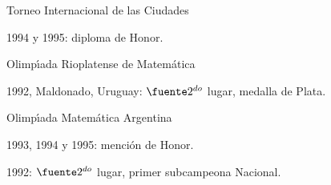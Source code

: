 \item { Torneo Internacional de las Ciudades}
\begin{compactitem}
\item 1994 y 1995: diploma de Honor.
\end{compactitem}

\item { Olimp\'{\i}ada Rioplatense de Matem\'atica}
\begin{compactitem}
\item 1992, Maldonado, Uruguay: $\fuente 2^{do}$ lugar, medalla de
Plata.
\end{compactitem}

\item { Olimp\'{\i}ada Matem\'atica Argentina}
\begin{compactitem}
\item 1993, 1994 y 1995: menci\'on de Honor. \item 1992: $\fuente
2^{do}$ lugar, primer subcampeona Nacional.
\end{compactitem}

